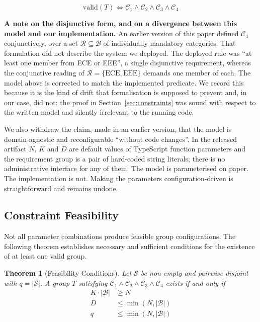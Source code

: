 \documentclass[11pt,a4paper]{article}
\theoremstyle{plain}
\newtheorem{theorem}{Theorem}
\theoremstyle{definition}
\theoremstyle{remark}
\begin{document}
\begin{equation}
    \text{valid}(T) \iff \mathcal{C}_1 \wedge \mathcal{C}_2 \wedge \mathcal{C}_3 \wedge \mathcal{C}_4
\end{equation}

\textbf{A note on the disjunctive form, and on a divergence between this model and our implementation.} An earlier version of this paper defined $\mathcal{C}_4$ conjunctively, over a set $\mathcal{R} \subseteq \mathcal{B}$ of individually mandatory categories. That formulation did not describe the system we deployed. The deployed rule was ``at least one member from ECE or EEE'', a single disjunctive requirement, whereas the conjunctive reading of $\mathcal{R} = \{\text{ECE}, \text{EEE}\}$ demands one member of each. The model above is corrected to match the implemented predicate. We record this because it is the kind of drift that formalisation is supposed to prevent and, in our case, did not: the proof in Section~\ref{sec:constraints} was sound with respect to the written model and silently irrelevant to the running code.

We also withdraw the claim, made in an earlier version, that the model is domain-agnostic and reconfigurable ``without code changes''. In the released artifact $N$, $K$ and $D$ are default values of TypeScript function parameters and the requirement group is a pair of hard-coded string literals; there is no administrative interface for any of them. The model is parameterised on paper. The implementation is not. Making the parameters configuration-driven is straightforward and remains undone.

\subsection{Constraint Feasibility}

Not all parameter combinations produce feasible group configurations. The following theorem establishes necessary and sufficient conditions for the existence of at least one valid group.

\begin{theorem}[Feasibility Conditions]
\label{thm:feasibility}
Let $\mathcal{S}$ be non-empty and pairwise disjoint with $q = |\mathcal{S}|$. A group $T$ satisfying $\mathcal{C}_1 \wedge \mathcal{C}_2 \wedge \mathcal{C}_3 \wedge \mathcal{C}_4$ exists if and only if
\begin{align}
    K \cdot |\mathcal{B}| &\geq N \label{eq:feas1} \\
    D &\leq \min(N, |\mathcal{B}|) \label{eq:feas2} \\
    q &\leq \min(N, |\mathcal{B}|) \label{eq:feas3}
\end{align}
\end{theorem}
\end{document}
